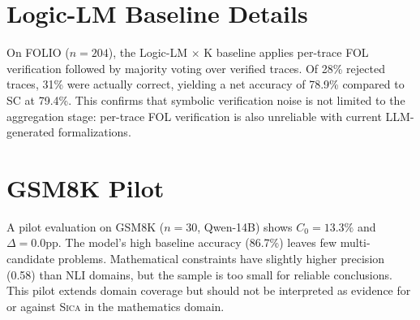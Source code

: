 \documentclass[11pt,a4paper]{article}
\newcommand{\sica}{\textsc{Sica}}
\newcommand{\czero}{C_0}
\begin{document}
\section{Logic-LM Baseline Details}
\label{app:logiclm}

On FOLIO ($n = 204$), the Logic-LM $\times$ K baseline applies per-trace FOL verification followed by majority voting over verified traces. Of 28\% rejected traces, 31\% were actually correct, yielding a net accuracy of 78.9\% compared to SC at 79.4\%. This confirms that symbolic verification noise is not limited to the aggregation stage: per-trace FOL verification is also unreliable with current LLM-generated formalizations.

\section{GSM8K Pilot}
\label{app:gsm8k}

A pilot evaluation on GSM8K ($n = 30$, Qwen-14B) shows $\czero = 13.3\%$ and $\Delta = 0.0$pp. The model's high baseline accuracy (86.7\%) leaves few multi-candidate problems. Mathematical constraints have slightly higher precision (0.58) than NLI domains, but the sample is too small for reliable conclusions. This pilot extends domain coverage but should not be interpreted as evidence for or against \sica{} in the mathematics domain.
\end{document}
